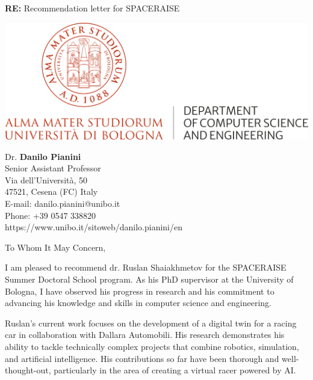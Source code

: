 \documentclass[12pt,a4paper]{letter} %
\makeatletter
\newcommand{\Who}{Danilo Pianini} %
\newcommand{\Role}{Senior Assistant Professor} %
\newcommand{\Title}{Dr.} %
\newcommand{\Department}{Department of Computer Science and Engineering} %
\newcommand{\Affiliation}{Alma Mater Studiorum---Università di Bologna} %
\newcommand{\Address}{Via dell'Università, 50} %
\newcommand{\CityZip}{47521, Cesena (FC) Italy} %
\newcommand{\Email}{E-mail: danilo.pianini@unibo.it} %
\newcommand{\TEL}{Phone: +39 0547 338820} %
\newcommand{\URL}{https://www.unibo.it/sitoweb/danilo.pianini/en} %
\makeatother
\begin{document}
\begin{letter}{\textbf{RE:} Recommendation letter for SPACERAISE}

\begin{minipage}{0.37\textwidth}
    \includegraphics[width=\textwidth]{images/DIP INFORMATICA-SCIENZA E INGEGNERIA_DISI_EN.png} %
\end{minipage}%
\hfill
\begin{minipage}{0.4\textwidth}
    \small
    \Title{} \textbf{\Who{}}\\
    \Role{}    \vspace{0.05\textwidth} \\
    \scriptsize
    \Address{}\\
    \CityZip{}\\
    \Email{}\\
    \TEL{}\\
    \URL{}\\
\end{minipage}\label{fig:figure}

\vspace{10mm}

\opening{To Whom It May Concern,}
I am pleased to recommend dr. Ruslan Shaiakhmetov for the SPACERAISE Summer Doctoral School program.
%
As his PhD supervisor at the University of Bologna,
I have observed his progress in research and his commitment to advancing his knowledge and skills in computer science and engineering.

Ruslan’s current work focuses on the development of a digital twin for a racing car in collaboration with Dallara Automobili.
His research demonstrates his ability to tackle technically complex projects that combine robotics,
simulation, and artificial intelligence.
%
His contributions so far have been thorough and well-thought-out, particularly in the area of creating a virtual racer powered by AI.


\end{letter}
\end{document}
